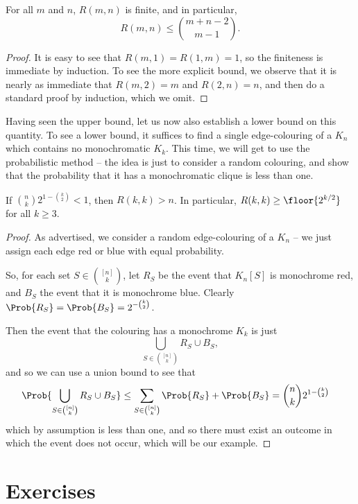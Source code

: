 \documentclass[nobib]{tufte-handout}
\begin{document}
\begin{corollary}
  For all $m$ and $n$, $R(m,n)$ is finite, and in particular,
  $$R(m,n) \leq \binom{m + n - 2}{m - 1}.$$

  \begin{proof}
    It is easy to see that $R(m,1) = R(1,m) = 1$, so the finiteness is immediate by induction. To see the more explicit bound, we observe that it is nearly as immediate that $R(m,2) = m$ and $R(2,n) = n$, and then do a standard proof by induction, which we omit.
  \end{proof}
\end{corollary}

Having seen the upper bound, let us now also establish a lower bound on this quantity. To see a lower bound, it suffices to find a single edge-colouring of a $K_n$ which contains no monochromatic $K_k$. This time, we will get to use the probabilistic method -- the idea is just to consider a random colouring, and show that the probability that it has a monochromatic clique is less than one.

\begin{theorem}[Erd\H{o}s, 1947]
  If $\binom{n}{k}2^{1 - \binom{k}{2}} < 1$, then $R(k,k) > n$. In particular, $R(k,k) \geq \floor{2^{k/2}}$ for all $k \geq 3$.

  \begin{proof}
    As advertised, we consider a random edge-colouring of a $K_n$ -- we just assign each edge red or blue with equal probability.

    So, for each set $S \in \binom{[n]}{k}$, let $R_S$ be the event that $K_n[S]$ is monochrome red, and $B_S$ the event that it is monochrome blue. Clearly $\Prob{R_S} = \Prob{B_S} = 2^{-\binom{k}{2}}$.
    
    Then the event that the colouring has a monochrome $K_k$ is just
    $$\bigcup_{S \in \binom{[n]}{k}} R_S \cup B_S,$$
    and so we can use a union bound to see that
    \begin{align*}
      \Prob{\bigcup_{S \in \binom{[n]}{k}} R_S \cup B_S} &\leq \sum_{S \in \binom{[n]}{k}} \Prob{R_S} + \Prob{B_S} = \binom{n}{k}2^{1 - \binom{k}{2}}
    \end{align*}
    which by assumption is less than one, and so there must exist an outcome in which the event does not occur, which will be our example.
  \end{proof}
\end{theorem}

\section{Exercises}


%
%
\end{document}
